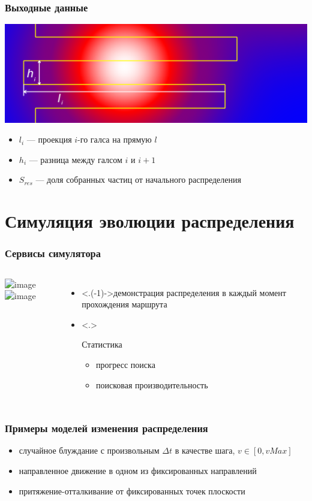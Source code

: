 \documentclass{beamer} %
\theoremstyle{definition} %
\begin{document}
\begin{frame}
  \frametitle{Выходные данные}
\includegraphics[width=\textwidth]{pics/pic06-lh.png}
\begin{itemize}
  \item $l_i$ --- проекция $i$-го галса на прямую $l$
  \item $h_i$ --- разница между галсом $i$ и $i+1$
  \item $S_{res}$ --- доля собранных частиц от начального распределения
\end{itemize}

\end{frame}

\section{Симуляция эволюции распределения} %
\begin{frame}
  \frametitle{Сервисы симулятора}
\begin{columns}
\includegraphics<+>[width=\textwidth]{pics/pic08-1.png}
\includegraphics<+>[width=\textwidth]{pics/pic08-2.png}
\begin{itemize}
\item<.(-1)->{демонстрация распределения в каждый момент прохождения маршрута}
\item<.>{Статистика
\begin{itemize}
  \item{\color{red} прогресс поиска}
  \item{\color{blue} поисковая производительность}
\end{itemize}
}
\end{itemize}
\end{columns}
\end{frame}

\begin{frame} 
\frametitle{Примеры моделей изменения распределения}
\begin{itemize}
\item{случайное блуждание с произвольным $\Delta t$ в качестве шага, $v \in [0, vMax]$}
\item{направленное движение в одном из фиксированных направлений}
\item{притяжение-отталкивание от фиксированных точек плоскости}
\end{itemize}
\end{frame}
\end{document}
